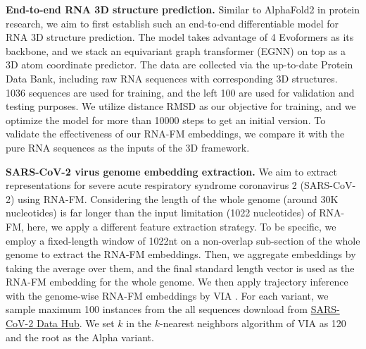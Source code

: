 \textbf{End-to-end RNA 3D structure prediction.}
Similar to AlphaFold2 in protein research, we aim to first establish such an end-to-end differentiable model for RNA 3D structure prediction. The model takes advantage of 4 Evoformers as its backbone, and we stack an equivariant graph transformer (EGNN) on top as a 3D atom coordinate predictor. The data are collected via the up-to-date Protein Data Bank, including raw RNA sequences with corresponding 3D structures. 1036 sequences are used for training, and the left 100 are used for validation and testing purposes. We utilize distance RMSD as our objective for training, and we optimize the model for more than 10000 steps to get an initial version. To validate the effectiveness of our RNA-FM embeddings, we compare it with the pure RNA sequences as the inputs of the 3D framework.

\textbf{SARS-CoV-2 virus genome embedding extraction.} 
We aim to extract representations for severe acute respiratory syndrome coronavirus 2 (SARS-CoV-2) using RNA-FM. Considering the length of the whole genome (around 30K nucleotides) is far longer than the input limitation (1022 nucleotides) of RNA-FM, here, we apply a different feature extraction strategy. To be specific, we employ a fixed-length window of 1022nt on a non-overlap sub-section of the whole genome to extract the RNA-FM embeddings. Then, we aggregate embeddings by taking the average over them, and the final standard length vector is used as the RNA-FM embedding for the whole genome. We then apply trajectory inference with the genome-wise RNA-FM embeddings by VIA \cite{stassen2021generalized}. For each variant, we sample maximum 100 instances from the all sequences download from \href{https://www.ncbi.nlm.nih.gov/labs/virus/vssi/#/virus?SeqType_s=Nucleotide&VirusLineage_ss=Severe%20acute%20respiratory%20syndrome%20coronavirus%202,%20taxid:2697049&Completeness_s=complete}{SARS-CoV-2 Data Hub}.
We set $k$ in the $k$-nearest neighbors algorithm of VIA as 120 and the root as the Alpha variant.

